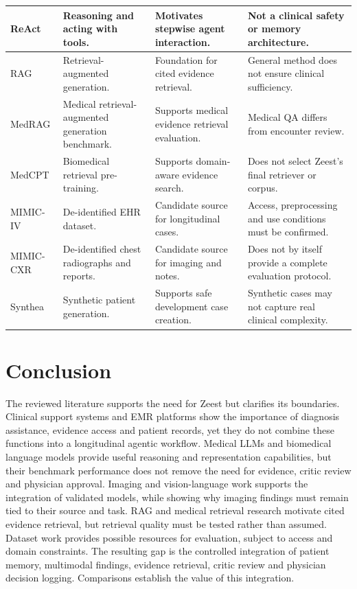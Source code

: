 \begin{reporttable}
\begin{tabular}{|p{}|p{}|p{}|p{}|}
ReAct \cite{zeestB:react} & Reasoning and acting with tools. & Motivates stepwise agent interaction. & Not a clinical safety or memory architecture. \\ \hline
RAG \cite{zeestA:rag} & Retrieval-augmented generation. & Foundation for cited evidence retrieval. & General method does not ensure clinical sufficiency. \\ \hline
MedRAG \cite{zeestB:medrag} & Medical retrieval-augmented generation benchmark. & Supports medical evidence retrieval evaluation. & Medical QA differs from encounter review. \\ \hline
MedCPT \cite{zeestB:medcpt} & Biomedical retrieval pre-training. & Supports domain-aware evidence search. & Does not select Zeest's final retriever or corpus. \\ \hline
MIMIC-IV \cite{zeestA:mimicIV} & De-identified EHR dataset. & Candidate source for longitudinal cases. & Access, preprocessing and use conditions must be confirmed. \\ \hline
MIMIC-CXR \cite{zeestB:mimiccxr} & De-identified chest radiographs and reports. & Candidate source for imaging and notes. & Does not by itself provide a complete evaluation protocol. \\ \hline
Synthea \cite{zeestB:synthea} & Synthetic patient generation. & Supports safe development case creation. & Synthetic cases may not capture real clinical complexity. \\ \hline
\end{tabular}
\end{reporttable}


\section{Conclusion}

The reviewed literature supports the need for Zeest but clarifies its boundaries. Clinical support systems and EMR platforms show the importance of diagnosis assistance, evidence access and patient records, yet they do not combine these functions into a longitudinal agentic workflow. Medical LLMs and biomedical language models provide useful reasoning and representation capabilities, but their benchmark performance does not remove the need for evidence, critic review and physician approval. Imaging and vision-language work supports the integration of validated models, while showing why imaging findings must remain tied to their source and task. RAG and medical retrieval research motivate cited evidence retrieval, but retrieval quality must be tested rather than assumed. Dataset work provides possible resources for evaluation, subject to access and domain constraints. The resulting gap is the controlled integration of patient memory, multimodal findings, evidence retrieval, critic review and physician decision logging. Comparisons establish the value of this integration.

\endgroup
